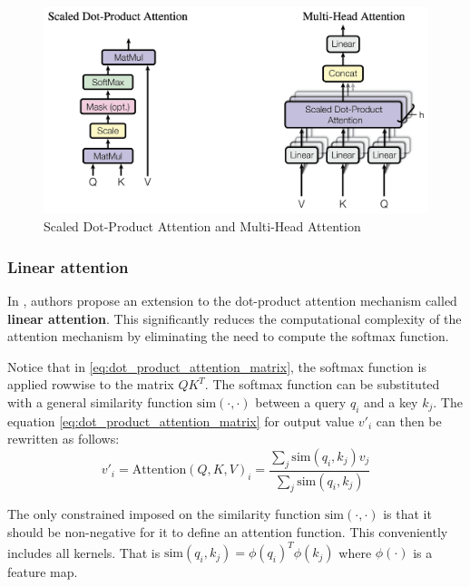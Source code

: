 \documentclass[a4paper, twoside]{report}
\theoremstyle{definition}
\numberwithin{equation}{section}
\begin{document}
\begin{figure}[h!]
    \centering
    \includegraphics[scale=0.15]{scaled_dot_product_attention.png}
    \caption{Scaled Dot-Product Attention and Multi-Head Attention \cite{1706.03762}}
    \label{fig:scaled_dot_product_attention}
\end{figure}




\subsubsection{Linear attention}

In \cite{2006.16236}, authors propose an extension to the dot-product attention mechanism called \textbf{linear attention}.
This significantly reduces the computational complexity of the attention mechanism by eliminating the need to compute the softmax function.

Notice that in \ref{eq:dot_product_attention_matrix}, the softmax function is applied rowwise to the matrix $Q K^T$.
The softmax function can be substituted with a general similarity function $\text{sim}(\cdot, \cdot)$ between a query $q_i$ and a key $k_j$.
The equation \ref{eq:dot_product_attention_matrix} for output value $v'_i$ can then be rewritten as follows:
\begin{equation}
    v'_i=\text{Attention}(Q, K, V)_i=\frac{\sum_j \text{sim}(q_i, k_j) v_j}{\sum_j \text{sim}(q_i, k_j)}
\end{equation}

The only constrained imposed on the similarity function $\text{sim}(\cdot, \cdot)$ is that it should be non-negative for it to define an attention function.
This conveniently includes all kernels. That is $\text{sim}(q_i, k_j)=\phi(q_i)^T \phi(k_j)$ where $\phi(\cdot)$ is a feature map.
\end{document}
